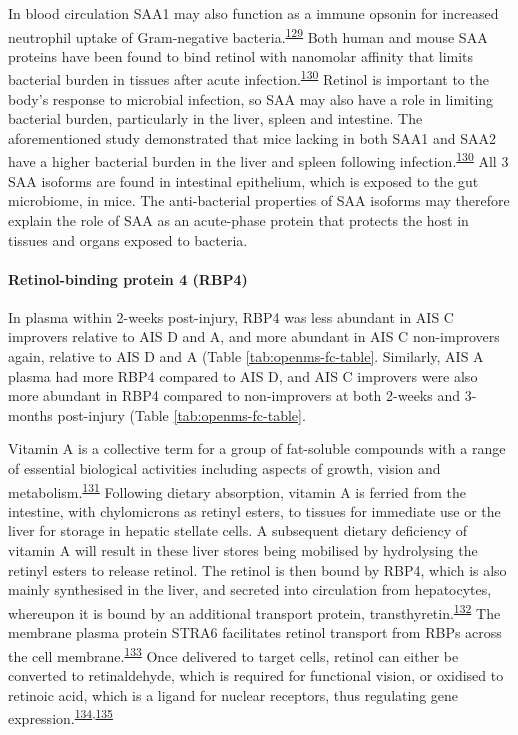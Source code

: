 \documentclass[
]{article}
\begin{document}
In blood circulation SAA1 may also function as a immune opsonin for increased neutrophil uptake of Gram-negative bacteria.\textsuperscript{\protect\hyperlink{ref-shah_serum_2006}{129}}
Both human and mouse SAA proteins have been found to bind retinol with nanomolar affinity that limits bacterial burden in tissues after acute infection.\textsuperscript{\protect\hyperlink{ref-derebe_serum_2014}{130}}
Retinol is important to the body's response to microbial infection, so SAA may also have a role in limiting bacterial burden, particularly in the liver, spleen and intestine.
The aforementioned study demonstrated that mice lacking in both SAA1 and SAA2 have a higher bacterial burden in the liver and spleen following infection.\textsuperscript{\protect\hyperlink{ref-derebe_serum_2014}{130}}
All 3 SAA isoforms are found in intestinal epithelium, which is exposed to the gut microbiome, in mice.
The anti-bacterial properties of SAA isoforms may therefore explain the role of SAA as an acute-phase protein that protects the host in tissues and organs exposed to bacteria.

\hypertarget{retinol-binding-protein-4-rbp4}{%
\paragraph{Retinol-binding protein 4 (RBP4)}\label{retinol-binding-protein-4-rbp4}}

In plasma within 2-weeks post-injury, RBP4 was less abundant in AIS C improvers relative to AIS D and A, and more abundant in AIS C non-improvers again, relative to AIS D and A (Table \ref{tab:openms-fc-table}.
Similarly, AIS A plasma had more RBP4 compared to AIS D, and AIS C improvers were also more abundant in RBP4 compared to non-improvers at both 2-weeks and 3-months post-injury (Table \ref{tab:openms-fc-table}.

Vitamin A is a collective term for a group of fat-soluble compounds with a range of essential biological activities including aspects of growth, vision and metabolism.\textsuperscript{\protect\hyperlink{ref-blomhoff_overview_2006}{131}}
Following dietary absorption, vitamin A is ferried from the intestine, with chylomicrons as retinyl esters, to tissues for immediate use or the liver for storage in hepatic stellate cells.
A subsequent dietary deficiency of vitamin A will result in these liver stores being mobilised by hydrolysing the retinyl esters to release retinol.
The retinol is then bound by RBP4, which is also mainly synthesised in the liver, and secreted into circulation from hepatocytes, whereupon it is bound by an additional transport protein, transthyretin.\textsuperscript{\protect\hyperlink{ref-peterson_studies_1971}{132}}
The membrane plasma protein STRA6 facilitates retinol transport from RBPs across the cell membrane.\textsuperscript{\protect\hyperlink{ref-berry_cross_2012}{133}}
Once delivered to target cells, retinol can either be converted to retinaldehyde, which is required for functional vision, or oxidised to retinoic acid, which is a ligand for nuclear receptors, thus regulating gene expression.\textsuperscript{\protect\hyperlink{ref-lane_role_2005}{134},\protect\hyperlink{ref-balmer_gene_2002}{135}}
\end{document}

